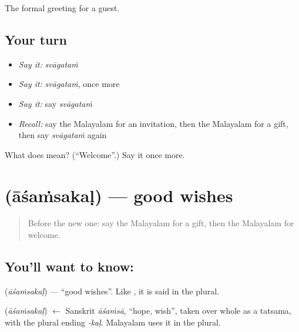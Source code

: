 \begin{grammarlens}[title={What you've built}]
The formal greeting for a guest.
\end{grammarlens}

\subsection*{Your turn}
\begin{itemize}
\raggedright
  \item \emph{Say it:} \emph{svāgataṁ}
  \item \emph{Say it:} \emph{svāgataṁ}, once more
  \item \emph{Say it:} say \emph{svāgataṁ}
  \item \emph{Recall:} say the Malayalam for an invitation, then the Malayalam for a gift, then say \emph{svāgataṁ} again
\end{itemize}

\begin{tcolorbox}[breakable,colback=teal!4,colframe=teal!35!black,title={Before you move on}]
What does  mean? (\textquotedblleft{}Welcome\textquotedblright{}.) Say it once more.
\end{tcolorbox}
\section[\texorpdfstring{\ml{ആശംസകൾ} (āśaṁsakaḷ)}{ആശംസകൾ (āśaṁsakaḷ)}]{ (āśaṁsakaḷ) — good wishes}

\label{lesson:ML-C124-wishes}



\begin{quote}
Before the new one: say the Malayalam for a gift, then the Malayalam for welcome.
\end{quote}

\subsection*{You'll want to know: }
\textbf{} (\emph{āśaṁsakaḷ}) — \textquotedblleft{}good wishes\textquotedblright{}. Like \textbf{}, it is said in the plural.

\begin{cousinweb}
\textbf{} (\emph{āśaṁsakaḷ}) $\leftarrow$ Sanskrit \emph{āśaṁsā}, \textquotedblleft{}hope, wish\textquotedblright{}, taken over whole as a tatsama, with the plural ending \emph{-kaḷ}. Malayalam uses it in the plural.
\end{cousinweb}

